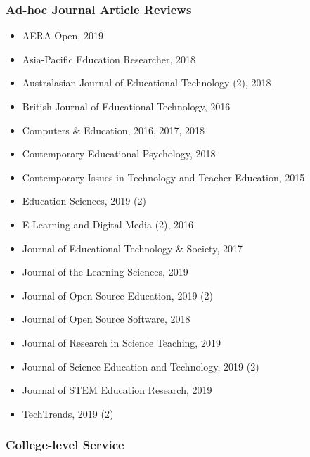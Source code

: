 \documentclass[14,]{article}
\providecommand{\tightlist}{%
  \setlength{\itemsep}{0pt}\setlength{\parskip}{0pt}}
\begin{document}
\hypertarget{ad-hoc-journal-article-reviews}{%
\subsubsection{Ad-hoc Journal Article
Reviews}\label{ad-hoc-journal-article-reviews}}

\begin{itemize}
\tightlist
\item
  AERA Open, 2019\\
\item
  Asia-Pacific Education Researcher, 2018\\
\item
  Australasian Journal of Educational Technology (2), 2018\\
\item
  British Journal of Educational Technology, 2016\\
\item
  Computers \& Education, 2016, 2017, 2018\\
\item
  Contemporary Educational Psychology, 2018\\
\item
  Contemporary Issues in Technology and Teacher Education, 2015\\
\item
  Education Sciences, 2019 (2)\\
\item
  E-Learning and Digital Media (2), 2016\\
\item
  Journal of Educational Technology \& Society, 2017\\
\item
  Journal of the Learning Sciences, 2019\\
\item
  Journal of Open Source Education, 2019 (2)
\item
  Journal of Open Source Software, 2018\\
\item
  Journal of Research in Science Teaching, 2019\\
\item
  Journal of Science Education and Technology, 2019 (2)
\item
  Journal of STEM Education Research, 2019
\item
  TechTrends, 2019 (2)
\end{itemize}

\hypertarget{college-level-service}{%
\subsubsection{College-level Service}\label{college-level-service}}
\end{document}
